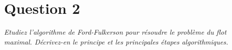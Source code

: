 \section{Question 2}
\textit{Etudiez l'algorithme de Ford-Fulkerson pour résoudre le problème du flot maximal. Décrivez-en le principe et les principales étapes algorithmiques.}

